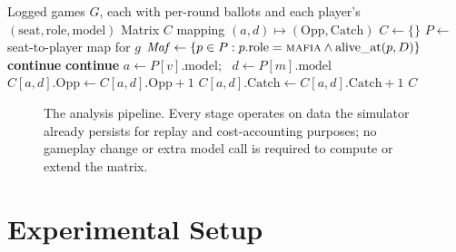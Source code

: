 \documentclass{article}
\begin{document}
\begin{algorithm}[t]
\caption{Cross-Vendor Deception-Asymmetry Matrix}
\label{alg:matrix}
\begin{algorithmic}[1]
\Require Logged games $G$, each with per-round ballots and each player's $(\mathrm{seat}, \mathrm{role}, \mathrm{model})$
\Ensure Matrix $C$ mapping $(a,d) \mapsto (\mathrm{Opp}, \mathrm{Catch})$
\State $C \gets \{\}$ 
  \State $P \gets$ seat-to-player map for $g$
    \State $\mathit{Maf} \gets \{p \in P : p.\mathrm{role} = \textsc{mafia} \wedge \mathrm{alive\_at}(p, D)\}$
     \textbf{continue} \EndIf
     
       \textbf{continue} \EndIf
        \State $a \gets P[v].\mathrm{model}$; \, $d \gets P[m].\mathrm{model}$
        \State $C[a,d].\mathrm{Opp} \gets C[a,d].\mathrm{Opp} + 1$
          \State $C[a,d].\mathrm{Catch} \gets C[a,d].\mathrm{Catch} + 1$
        \EndIf
      \EndFor
    \EndFor
  \EndFor
\EndFor
\State \Return $C$
\end{algorithmic}
\end{algorithm}

\begin{figure}[t]
\centering
{}
\caption{The analysis pipeline. Every stage operates on data the simulator already persists for replay and cost-accounting purposes; no gameplay change or extra model call is required to compute or extend the matrix.}
\label{fig:pipeline}
\end{figure}

\section{Experimental Setup}
\label{sec:setup}
\end{document}
